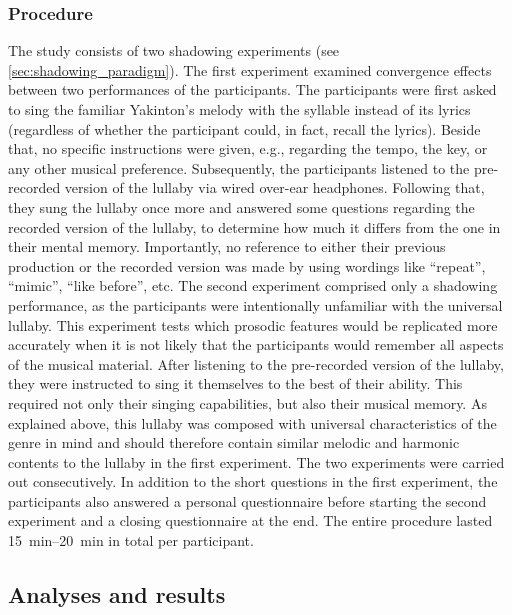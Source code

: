 \subsubsection{Procedure}
\label{subsubsec:procedure_music}

The study consists of two shadowing experiments (see \cref{sec:shadowing_paradigm}).
The first experiment examined convergence effects between two performances of the participants.
The participants were first asked to sing the familiar Yakinton's melody with the syllable \textipa{[na]} instead of its lyrics (regardless of whether the participant could, in fact, recall the lyrics).
Beside that, no specific instructions were given, e.g., regarding the tempo, the key, or any other musical preference.
Subsequently, the participants listened to the pre-recorded version of the lullaby via wired over-ear headphones. %
Following that, they sung the lullaby once more and answered some questions regarding the recorded version of the lullaby, to determine how much it differs from the one in their mental memory.
Importantly, no reference to either their previous production or the recorded version was made by using wordings like \enquote{repeat}, \enquote{mimic}, \enquote{like before}, etc.
The second experiment comprised only a shadowing performance, as the participants were intentionally unfamiliar with the universal lullaby.
This experiment tests which prosodic features would be replicated more accurately when it is not likely that the participants would remember all aspects of the musical material.
After listening to the pre-recorded version of the lullaby, they were instructed to sing it themselves to the best of their ability.
This required not only their singing capabilities, but also their musical memory.
As explained above, this lullaby was composed with universal characteristics of the genre in mind and should therefore contain similar melodic and harmonic contents to the lullaby in the first experiment.
The two experiments were carried out consecutively.
In addition to the short questions in the first experiment, the participants also answered a personal questionnaire before starting the second experiment and a closing questionnaire at the end.
The entire procedure lasted \SIrange{15}{20}{\minute} in total per participant.

\subsection{Analyses and results}
\label{subsec:results_music}

